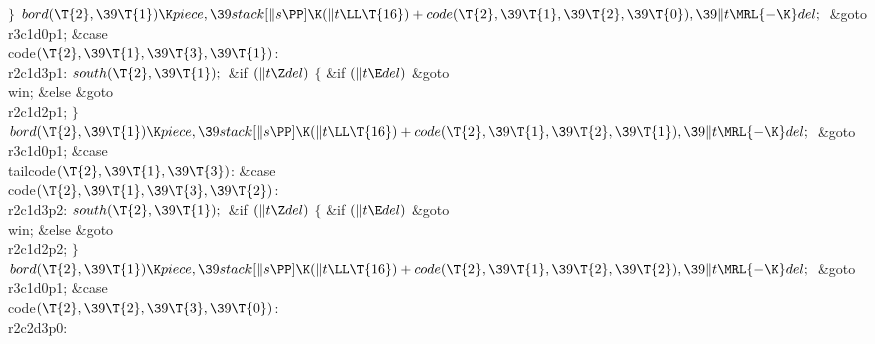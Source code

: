\2${}\}{}$\2\6
${}\\{bord}(\T{2},\39\T{1})\K\\{piece},\39\\{stack}[\|s\PP]\K(\|t\LL\T{16})+%
\\{code}(\T{2},\39\T{1},\39\T{2},\39\T{0}),\39\|t\MRL{-{\K}}\\{del};{}$\6
\&{goto} \\{r3c1d0p1};\6
\4\&{case} \\{code}${}(\T{2},\39\T{1},\39\T{3},\39\T{1}){}$:\5
\\{r2c1d3p1}:\5
${}\\{south}(\T{2},\39\T{1});{}$\6
\&{if} ${}(\|t\Z\\{del}){}$\5
${}\{{}$\5
\1\&{if} ${}(\|t\E\\{del}){}$\1\5
\&{goto} \\{win};\5
\2\&{else}\1\5
\&{goto} \\{r2c1d2p1};\5
\2${}\}{}$\2\6
${}\\{bord}(\T{2},\39\T{1})\K\\{piece},\39\\{stack}[\|s\PP]\K(\|t\LL\T{16})+%
\\{code}(\T{2},\39\T{1},\39\T{2},\39\T{1}),\39\|t\MRL{-{\K}}\\{del};{}$\6
\&{goto} \\{r3c1d0p1};\6
\4\&{case} \\{tailcode}${}(\T{2},\39\T{1},\39\T{3}){}$:\5
\&{case} \\{code}${}(\T{2},\39\T{1},\39\T{3},\39\T{2}){}$:\5
\\{r2c1d3p2}:\5
${}\\{south}(\T{2},\39\T{1});{}$\6
\&{if} ${}(\|t\Z\\{del}){}$\5
${}\{{}$\5
\1\&{if} ${}(\|t\E\\{del}){}$\1\5
\&{goto} \\{win};\5
\2\&{else}\1\5
\&{goto} \\{r2c1d2p2};\5
\2${}\}{}$\2\6
${}\\{bord}(\T{2},\39\T{1})\K\\{piece},\39\\{stack}[\|s\PP]\K(\|t\LL\T{16})+%
\\{code}(\T{2},\39\T{1},\39\T{2},\39\T{2}),\39\|t\MRL{-{\K}}\\{del};{}$\6
\&{goto} \\{r3c1d0p1};\6
\4\&{case} \\{code}${}(\T{2},\39\T{2},\39\T{3},\39\T{0}){}$:\5
\\{r2c2d3p0}:\5
